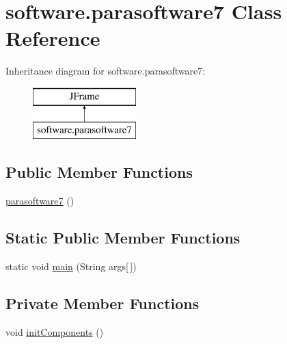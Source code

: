 \hypertarget{classsoftware_1_1parasoftware7}{}\section{software.\+parasoftware7 Class Reference}
\label{classsoftware_1_1parasoftware7}
Inheritance diagram for software.\+parasoftware7\+:\begin{figure}[H]
\begin{center}
\leavevmode
\includegraphics[height=2.000000cm]{classsoftware_1_1parasoftware7}
\end{center}
\end{figure}
\subsection*{Public Member Functions}
\begin{DoxyCompactItemize}
\item 
\mbox{\hyperlink{classsoftware_1_1parasoftware7_a6c9418145b285cdcee5407d2f413c85b}{parasoftware7}} ()
\end{DoxyCompactItemize}
\subsection*{Static Public Member Functions}
\begin{DoxyCompactItemize}
\item 
static void \mbox{\hyperlink{classsoftware_1_1parasoftware7_a456d5d0a82d053ae77f2f9413e45f403}{main}} (String args\mbox{[}$\,$\mbox{]})
\end{DoxyCompactItemize}
\subsection*{Private Member Functions}
\begin{DoxyCompactItemize}
\item 
void \mbox{\hyperlink{classsoftware_1_1parasoftware7_a7c4f26cc8b46641d35e8e30c4555c5fd}{init\+Components}} ()
\end{DoxyCompactItemize}
